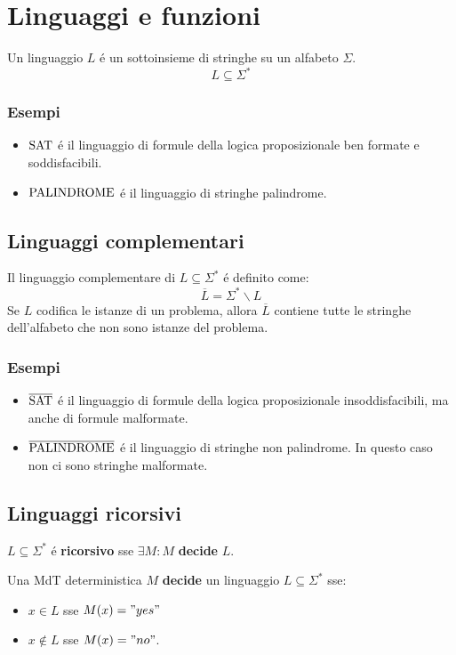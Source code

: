 \section{Linguaggi e funzioni}
Un linguaggio $L$ é un sottoinsieme di stringhe su un alfabeto $\Sigma$.
\[
L \subseteq \Sigma^*
\]

\subsubsection*{Esempi}
\begin{itemize}
	\item ${\text{SAT}}$ é il linguaggio di formule della logica proposizionale ben formate e soddisfacibili.
	\item ${\text{PALINDROME}}$ é il linguaggio di stringhe palindrome.
\end{itemize}


\subsection{Linguaggi complementari}
Il linguaggio complementare di $L \subseteq \Sigma^*$ é definito come:
\[\overline{L} = \Sigma^* \smallsetminus L\]
Se $L$ codifica le istanze di un problema, allora $\overline{L}$ contiene tutte le stringhe dell'alfabeto che non sono istanze del problema.
\subsubsection*{Esempi}
\begin{itemize}
	\item $\overline{\text{SAT}}$ é il linguaggio di formule della logica proposizionale insoddisfacibili, ma anche di formule malformate.
	\item $\overline{\text{PALINDROME}}$ é il linguaggio di stringhe non palindrome. In questo caso non ci sono stringhe malformate.
\end{itemize}


\subsection{Linguaggi ricorsivi}
$L \subseteq \Sigma^*$ é \textbf{ricorsivo} sse $\exists M : M$ \textbf{decide} $L$.

Una MdT deterministica $M$ \textbf{decide} un linguaggio $L \subseteq \Sigma^*$ sse:
\begin{itemize}
	\item $x \in L$ sse $M(x) = "yes"$
	\item $x \notin L$ sse $M(x) = "no"$.
\end{itemize}

